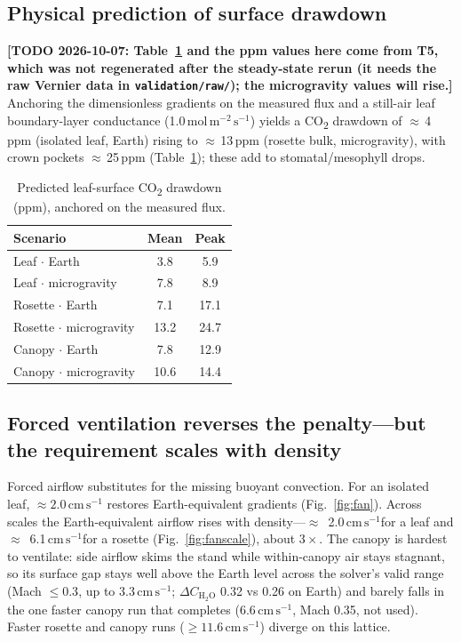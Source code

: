 \documentclass[10pt]{article}
\newcommand{\cmsu}{\ensuremath{\mathrm{cm\,s^{-1}}}}
\newcommand{\molms}{\ensuremath{\mathrm{mol\,m^{-2}\,s^{-1}}}}
\newcommand{\co}{CO\textsubscript{2}}
\begin{document}
\subsection{Physical prediction of surface drawdown}
\textbf{[TODO 2026-10-07: Table~\ref{tab:ppm} and the ppm values here come from T5, which was not regenerated after the steady-state rerun (it needs the raw Vernier data in \texttt{validation/raw/}); the microgravity values will rise.]}
Anchoring the dimensionless gradients on the measured flux and a still-air leaf boundary-layer conductance
(1.0\,\molms) yields a \co{} drawdown of $\approx$\,4\,ppm (isolated leaf, Earth)
rising to $\approx$\,13\,ppm (rosette bulk, microgravity), with crown pockets $\approx$\,25\,ppm
(Table~\ref{tab:ppm}); these add to stomatal/mesophyll drops.

\begin{table}[t]\centering\small
\caption{Predicted leaf-surface \co{} drawdown (ppm), anchored on the measured flux.}\label{tab:ppm}
\begin{tabular}{lcc}
\toprule
Scenario & Mean & Peak\\
\midrule
Leaf $\cdot$ Earth & 3.8 & 5.9\\
Leaf $\cdot$ microgravity & 7.8 & 8.9\\
Rosette $\cdot$ Earth & 7.1 & 17.1\\
Rosette $\cdot$ microgravity & 13.2 & 24.7\\
Canopy $\cdot$ Earth & 7.8 & 12.9\\
Canopy $\cdot$ microgravity & 10.6 & 14.4\\
\bottomrule
\end{tabular}
\end{table}

\subsection{Forced ventilation reverses the penalty---but the requirement scales with density}
Forced airflow substitutes for the missing buoyant convection. For an isolated leaf, $\approx2.0\,\cmsu$
restores Earth-equivalent gradients (Fig.~\ref{fig:fan}). Across scales the Earth-equivalent airflow rises with
density---$\approx$~2.0\,\cmsu for a leaf and $\approx$~6.1\,\cmsu for a rosette (Fig.~\ref{fig:fanscale}), about
$3\times$. The canopy is hardest to ventilate: side airflow skims the stand while within-canopy air stays
stagnant, so its surface gap stays well above the Earth level across the solver's valid range (Mach $\le0.3$, up to
3.3\,\cmsu; $\Delta C_{\mathrm{H_2O}}$ 0.32 vs 0.26 on Earth) and barely falls in the one faster canopy run that
completes (6.6\,\cmsu, Mach 0.35, not used). Faster rosette and canopy runs ($\ge11.6\,\cmsu$) diverge on this lattice.
\end{document}
